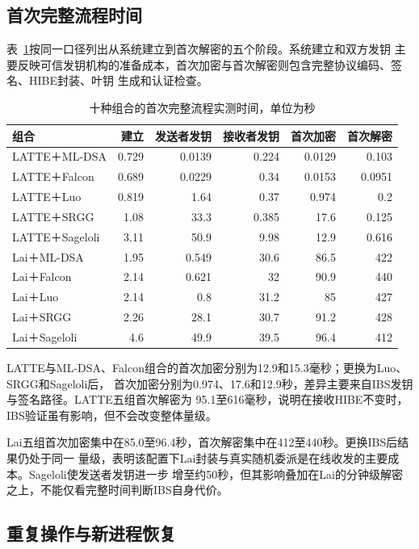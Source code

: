\subsection{首次完整流程时间}

表~\ref{tab:ten-first-times}按同一口径列出从系统建立到首次解密的五个阶段。系统建立和双方发钥
主要反映可信发钥机构的准备成本，首次加密与首次解密则包含完整协议编码、签名、HIBE封装、叶钥
生成和认证检查。

\begin{table}[H]
\centering\small
\caption{十种组合的首次完整流程实测时间，单位为秒}
\label{tab:ten-first-times}
\setlength{\tabcolsep}{4pt}
\begin{tabular}{@{}lrrrrr@{}}
\toprule
\rowcolor{black!8} 组合 & 建立 & 发送者发钥 & 接收者发钥 & 首次加密 & 首次解密 \\
\midrule
LATTE＋ML-DSA & 0.729 & 0.0139 & 0.224 & 0.0129 & 0.103 \\
LATTE＋Falcon & 0.689 & 0.0229 & 0.34 & 0.0153 & 0.0951 \\
LATTE＋Luo & 0.819 & 1.64 & 0.37 & 0.974 & 0.2 \\
LATTE＋SRGG & 1.08 & 33.3 & 0.385 & 17.6 & 0.125 \\
LATTE＋Sageloli & 3.11 & 50.9 & 9.98 & 12.9 & 0.616 \\
Lai＋ML-DSA & 1.95 & 0.549 & 30.6 & 86.5 & 422 \\
Lai＋Falcon & 2.14 & 0.621 & 32 & 90.9 & 440 \\
Lai＋Luo & 2.14 & 0.8 & 31.2 & 85 & 427 \\
Lai＋SRGG & 2.26 & 28.1 & 30.7 & 91.2 & 428 \\
Lai＋Sageloli & 4.6 & 49.9 & 39.5 & 96.4 & 412 \\
\bottomrule
\end{tabular}
\end{table}

LATTE与ML-DSA、Falcon组合的首次加密分别为12.9和15.3毫秒；更换为Luo、SRGG和Sageloli后，
首次加密分别为0.974、17.6和12.9秒，差异主要来自IBS发钥与签名路径。LATTE五组首次解密为
95.1至616毫秒，说明在接收HIBE不变时，IBS验证虽有影响，但不会改变整体量级。

Lai五组首次加密集中在85.0至96.4秒，首次解密集中在412至440秒。更换IBS后结果仍处于同一
量级，表明该配置下Lai封装与真实随机委派是在线收发的主要成本。Sageloli使发送者发钥进一步
增至约50秒，但其影响叠加在Lai的分钟级解密之上，不能仅看完整时间判断IBS自身代价。

\subsection{重复操作与新进程恢复}

